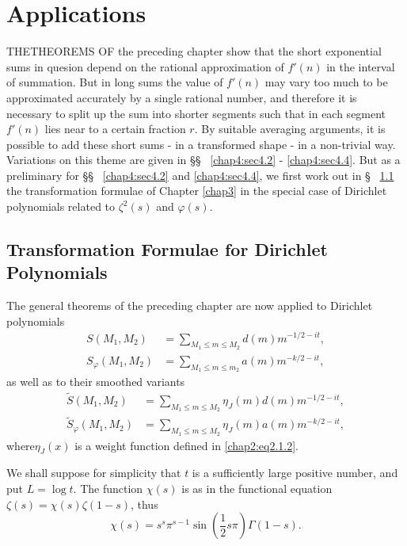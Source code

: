 
\chapter{Applications}\label{chap4}

THE\pageoriginale THEOREMS OF the preceding chapter show that the
short exponential sums in quesion depend on the rational approximation
of $f'(n)$ in the interval of summation. But in long sums the value of
$f'(n)$ may vary too much to be approximated accurately by a single
rational number, and therefore it is necessary to split up the sum
into shorter segments such that in each segment $f'(n)$ lies near to a
certain fraction $r$. By suitable averaging arguments, it is possible
to add these short sums - in a transformed shape - in a non-trivial
way. Variations on this theme are given in \S\S~ \ref{chap4:sec4.2} -
\ref{chap4:sec4.4}. But as a preliminary for \S\S ~ \ref{chap4:sec4.2}
and \ref{chap4:sec4.4}, we first work out in \S~ \ref{chap4:sec4.1}
the transformation formulae of Chapter \ref{chap3} in the special case
of Dirichlet polynomials related to $\zeta^2(s)$ and $\varphi(s)$.

\section{Transformation Formulae for Dirichlet
  Polynomials}\label{chap4:sec4.1} 

The general theorems of the preceding chapter are now applied to\break
Dirichlet polynomials
\begin{align}
S\left(M_1,M_2\right) &= \sum\limits_{M_1\leq m\leq M_2}d(m)
m^{-1/2-it},\label{chap4:eq4.1.1}\\
S_{\varphi}\left(M_1,M_2\right) &= \sum\limits_{M_1\leq m\leq m_2}
a(m)m^{-k /2-it},\label{chap4:eq4.1.2}
\end{align}
as well as to their smoothed variants
\begin{align}
\tilde{S}\left(M_1,M_2\right) &= \sum\limits_{M_1\leq m\leq M_2}
\eta_J(m)d(m)m^{-1/2-it},\label{chap4:eq4.1.3}\\
\tilde{S}_\varphi\left(M_1,M_2\right) &= \sum\limits_{M_1\leq m\leq
M_2} \eta_J(m)a(m)m^{-k /2-it},\label{chap4:eq4.1.4}
\end{align}
where\pageoriginale $\eta_J(x)$ is a weight function defined in
\eqref{chap2:eq2.1.2}.

We shall suppose for simplicity that $t$ is a sufficiently large
positive number, and put $L=\log t$. The function $\chi(s)$ is as in
the functional equation $\zeta(s)=\chi(s)\zeta(1-s)$, thus 
$$
\chi(s)=s^s\pi^{s-1}\sin\left(\frac{1}{2}s\pi\right)\Gamma(1-s).
$$

